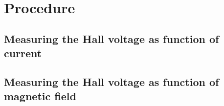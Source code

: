 \section{Procedure}
\label{sec:procedure}

\subsection{Measuring the Hall voltage as function of current}
\label{sec:procedure:a}

\subsection{Measuring the Hall voltage as function of magnetic
field}
\label{sec:procedure:b}

